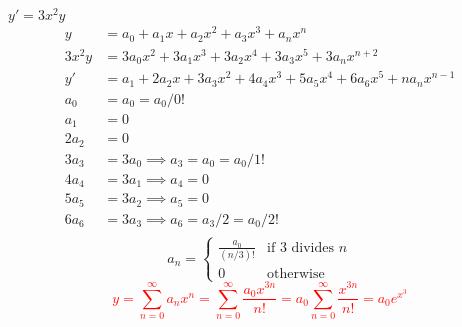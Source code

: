 \item $y'=3x^2y$
\begin{align*}
    y &= a_0 + a_1x + a_2x^2 + a_3x^3 + a_nx^n\\
    3x^2y &= 3a_0x^2 + 3a_1x^3 + 3a_2x^4 + 3a_3x^5 + 3a_nx^{n+2}\\
    y' &= a_1 + 2a_2x + 3a_3x^2 + 4a_4x^3 + 5a_5x^4 + 6a_6x^5 + na_nx^{n-1} \\
    a_0 &= a_0 = a_0/0! \\
    a_1 &= 0\\
    2a_2 &= 0\\
    3a_3 &= 3a_0 \implies a_3 = a_0 = a_0/1!\\
    4a_4 &= 3a_1 \implies a_4 = 0\\
    5a_5 &= 3a_2 \implies a_5 = 0\\
    6a_6 &= 3a_3 \implies a_6 = a_3/2 = a_0/2!\\
\end{align*}
\[
a_n = 
\begin{cases}
    \frac{a_0}{(n/3)!} & \text{if $3$ divides }n\\
    0 & \text{otherwise}
\end{cases}
\]
\textcolor{red}{\[
    y 
    = \sum_{n=0}^\infty a_nx^n
    = \sum_{n=0}^\infty \frac{a_0x^{3n}}{n!} 
    = a_0\sum_{n=0}^\infty \frac{x^{3n}}{n!} 
    = a_0e^{x^3}
\]}